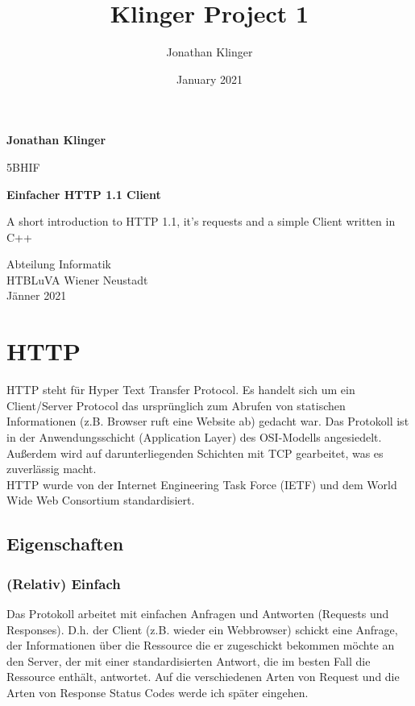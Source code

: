 \documentclass{article}
\title{Klinger Project 1}
\author{Jonathan Klinger }
\date{January 2021}
\begin{document}
\begin{titlepage}
    \begin{center}
        \vspace*{1cm}
            
        \Huge
        \textbf{Jonathan Klinger}
            
        \vspace{0.5cm}
        \LARGE
        5BHIF
            
        \vspace{1.5cm}
            
        \textbf{Einfacher HTTP 1.1 Client}
            
        \vfill
            
        A short introduction to HTTP 1.1, it's requests and a simple Client written in C++
            
        \vspace{0.8cm}
            
        \Large
        Abteilung Informatik\\
        HTBLuVA Wiener Neustadt\\
        Jänner 2021
            
    \end{center}
\end{titlepage}

\tableofcontents
\pagebreak

\section{HTTP}

HTTP steht für Hyper Text Transfer Protocol. Es handelt sich um ein Client/Server Protocol das ursprünglich zum Abrufen von statischen Informationen (z.B. Browser ruft eine Website ab) gedacht war.
Das Protokoll ist in der Anwendungsschicht (Application Layer) des OSI-Modells angesiedelt. Außerdem wird auf darunterliegenden Schichten mit TCP gearbeitet, was es zuverlässig macht. \\
HTTP wurde von der Internet Engineering Task Force (IETF) und dem World Wide Web Consortium standardisiert. 

\subsection{Eigenschaften}
\subsubsection{(Relativ) Einfach}
Das Protokoll arbeitet mit einfachen Anfragen und Antworten (Requests und Responses). D.h. der Client (z.B. wieder ein Webbrowser) schickt eine Anfrage, der Informationen über die Ressource die er zugeschickt bekommen möchte an den Server, der mit einer standardisierten Antwort, die im besten Fall die Ressource enthält, antwortet. Auf die verschiedenen Arten von Request und die Arten von Response Status Codes werde ich später eingehen. 
\end{document}

